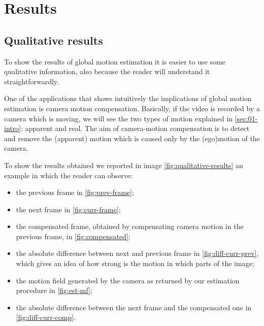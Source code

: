 \section{Results}
\label{sec:04-results}

\subsection{Qualitative results}
To show the results of global motion estimation it is easier to use some qualitative information, also because the reader will understand it straightforwardly.

One of the applications that shows intuitively the implications of global motion estimation is camera motion compensation. 
Basically, if the video is recorded by a camera which is moving, we will see the two types of motion explained in \cref{sec:01-intro}: apparent and real. The aim of camera-motion compensation is to detect and remove the (apparent) motion which is caused only by the (ego)motion of the camera.

To show the results obtained we reported in image \cref{fig:qualitative-results} an example in which the reader can observe:
\begin{itemize}
    \item the previous frame in \cref{fig:prev-frame};
    \item the next frame in \cref{fig:curr-frame};
    \item the compensated frame, obtained by compensating camera motion in the previous frame, in \cref{fig:compensated};
    \item the absolute difference between next and previous frame in \cref{fig:diff-curr-prev}, which gives an idea of how strong is the motion in which parts of the image;
    \item the motion field generated by the camera as returned by our estimation procedure in \cref{fig:est-mf};
    \item the absolute difference between the next frame and the compensated one in \cref{fig:diff-curr-comp}.
\end{itemize}

